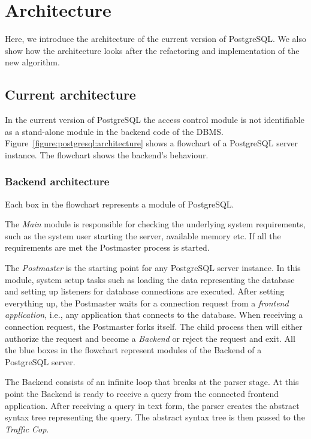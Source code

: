 \section{Architecture}


Here, we introduce the architecture of the current version of PostgreSQL.
%
We also show how the architecture looks after the refactoring and implementation of the new algorithm.
%


%
\subsection{Current architecture}
%
In the current version of PostgreSQL the access control module is not identifiable as a stand-alone module in the backend code of the DBMS.
%
Figure~\ref{figure:postgresql:architecture} shows a flowchart of a PostgreSQL server instance.
%
The flowchart shows the backend's behaviour.
%
\subsubsection{Backend architecture}
%
Each box in the flowchart represents a module of PostgreSQL.

The \emph{Main} module is responsible for checking the underlying system requirements, such as the system user starting the server, available memory etc. If all the requirements are met the {Postmaster} process is started.

The \emph{Postmaster} is the starting point for any PostgreSQL server instance. 
%
In this module, system setup tasks such as loading the data representing the database and setting up listeners for database connections are executed.
%
After setting everything up, the Postmaster waits for a connection request from a \emph{frontend application}, i.e., any application that connects to the database.
%
When receiving a connection request, the Postmaster forks itself.
%
The child process then will either authorize the request and become a \emph{Backend} or reject the request and exit. 
%
All the blue boxes in the flowchart represent modules of the Backend of a PostgreSQL server.

The Backend consists of an infinite loop that breaks at the parser stage.
%
At this point the Backend is ready to receive a query from the connected frontend application.
%
After receiving a query in text form, the parser creates the abstract syntax tree representing the query.
%
The abstract syntax tree is then passed to the \emph{Traffic Cop}.

